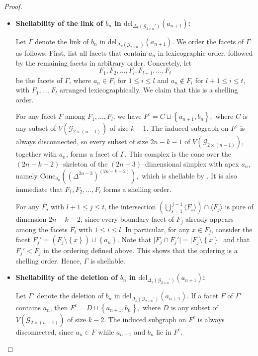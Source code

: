 \documentclass[11pt,reqno,a4paper]{amsart}
\theoremstyle{definition}
\theoremstyle{theorem}
\newcommand{\kcut}{\Delta_{k}}
\newcommand{\twoggp}{\mathcal{G}_{2\times n}'}
\newcommand{\lno}{\left(}
\newcommand{\rno}{\right)}
\newcommand{\lcu}{\left\{}
\newcommand{\rcu}{\right\}}
\newcommand{\del}{\mathrm{del}}
\newcommand{\cone}{\mathrm{Cone}}
\theoremstyle{remark}
\begin{document}
\begin{proof}
\begin{enumerate}
		\begin{itemize}
			\itemsep1em
			\item \textbf{Shellability of the link of $b_n$ in $\del_{\kcut\lno\twoggp\rno}\lno a_{n+1} \rno$:}
			
			Let $\Gamma$ denote the link of $b_n$ in $\del_{\kcut\lno\twoggp\rno}\lno a_{n+1} \rno$. We order the facets of $\Gamma$ as follows. First, list all facets that contain $a_n$ in lexicographic order, followed by the remaining facets in arbitrary order. Concretely, let
			\[
			F_1, F_2, \dots, F_l, F_{l+1}, \dots, F_t
			\]
			be the facets of $\Gamma$, where $a_n \in F_i$ for $1 \le i \le l$ and $a_n \notin F_i$ for $l+1 \le i \le t$, with $F_1,\dots,F_l$ arranged lexicographically. We claim that this is a shelling order.
			
			For any facet $F$ among $F_1,\dots,F_l$, we have $F^c = C \sqcup \lcu a_{n+1}, b_n \rcu,$	where $C$ is any subset of $V\lno \mathcal{G}_{2 \times \lno n-1 \rno}\rno$ of size $k-1$. The induced subgraph on $F^c$ is always disconnected, so every subset of size $2n-k-1$ of $V\lno \mathcal{G}_{2 \times \lno n-1 \rno}\rno$, together with $a_n$, forms a facet of $\Gamma$. This complex is the cone over the $\lno 2n-k-2 \rno$–skeleton of the $\lno 2n-3 \rno$–dimensional simplex with apex $a_n$, namely $	\cone_{a_n}\lno \lno \Delta^{2n-3}\rno^{\lno 2n-k-2 \rno} \rno,$ which is shellable by . It is also immediate that $F_1, F_2,\dots, F_l$ forms a shelling order.
			
			For any $F_j$ with $l+1 \le j \le t$, the intersection $\displaystyle \lno \bigcup_{s=1}^{\,j-1} \langle F_s \rangle \rno \cap \langle F_j \rangle$ is pure of dimension $2n-k-2$, since every boundary facet of $F_j$ already appears among the facets $F_i$ with $1 \le i \le l$. In particular, for any $x \in F_j$, consider the facet $F_j' = \lno F_j \setminus \lcu x \rcu \rno \cup \lcu a_n \rcu.$ Note that $\lvert F_j \cap F_j' \rvert = \lvert F_j \setminus \lcu x \rcu \rvert$ and that $F_j' < F_j$ in the ordering defined above. This shows that the ordering is a shelling order. Hence, $\Gamma$ is shellable.
			
			\item \textbf{Shellability of the deletion of $b_n$ in $\del_{\kcut \lno\twoggp\rno}\lno a_{n+1} \rno$:}
			
			Let $\Gamma'$ denote the deletion of $b_n$ in $\del_{\kcut \lno\twoggp\rno}\lno a_{n+1} \rno$. If a facet $F$ of $\Gamma'$ contains $a_n$, then $F^c = D \sqcup \lcu a_{n+1}, b_n \rcu,$ where $D$ is any subset of $V\lno \mathcal{G}_{2 \times \lno n-1 \rno}\rno$ of size $k-2$. The induced subgraph on $F^c$ is always disconnected, since $a_n \in F$ while $a_{n+1}$ and $b_n$ lie in $F^c$. 
			

\end{itemize}
\end{enumerate}
\end{proof}
\end{document}

